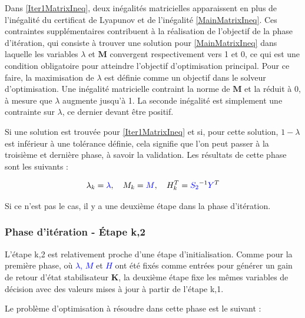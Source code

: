 Dans \eqref{Iter1MatrixIneq}, deux inégalités matricielles apparaissent en plus de l'inégalité du certificat de Lyapunov et de l'inégalité \eqref{MainMatrixIneq}. Ces contraintes supplémentaires contribuent à la réalisation de l'objectif de la phase d'itération, qui consiste à trouver une solution pour \eqref{MainMatrixIneq} dans laquelle les variables $\lambda$ et $\boldsymbol{M}$ convergent respectivement vers 1 et 0, ce qui est une condition obligatoire pour atteindre l'objectif d'optimisation principal. Pour ce faire, la maximisation de $\lambda$ est définie comme un objectif dans le solveur d'optimisation. Une inégalité matricielle contraint la norme de $\boldsymbol{M}$ et la réduit à 0, à mesure que $\lambda$ augmente jusqu'à 1. La seconde inégalité est simplement une contrainte sur $\lambda$, ce dernier devant être positif.


Si une solution est trouvée pour \eqref{Iter1MatrixIneq} et si, pour cette solution, $1-\lambda$ est inférieur à une tolérance définie, cela signifie que l'on peut passer à la troisième et dernière phase, à savoir la validation. Les résultats de cette phase sont les suivants :

\begin{equation}
    \begin{gathered}
        \lambda_k=\textcolor{blue}{\lambda},  \quad
        M_k = \textcolor{blue}{M}, \quad
        H_k^T = \textcolor{blue}{S_2}^{-1} \textcolor{blue}{Y}^T
    \end{gathered}
    \label{OutputsIterStap2}
\end{equation}

Si ce n'est pas le cas, il y a une deuxième étape dans la phase d'itération.

\subsubsection{Phase d'itération - Étape k,2}


L'étape k,2 est relativement proche d'une étape d'initialisation. Comme pour la première phase, où \textcolor{blue}{$\lambda$, $M$} et \textcolor{blue}{$H$} ont été fixés comme entrées pour générer un gain de retour d'état stabilisateur $\boldsymbol{K}$, la deuxième étape fixe les mêmes variables de décision avec des valeurs mises à jour à partir de l'étape k,1.

Le problème d'optimisation à résoudre dans cette phase est le suivant :


